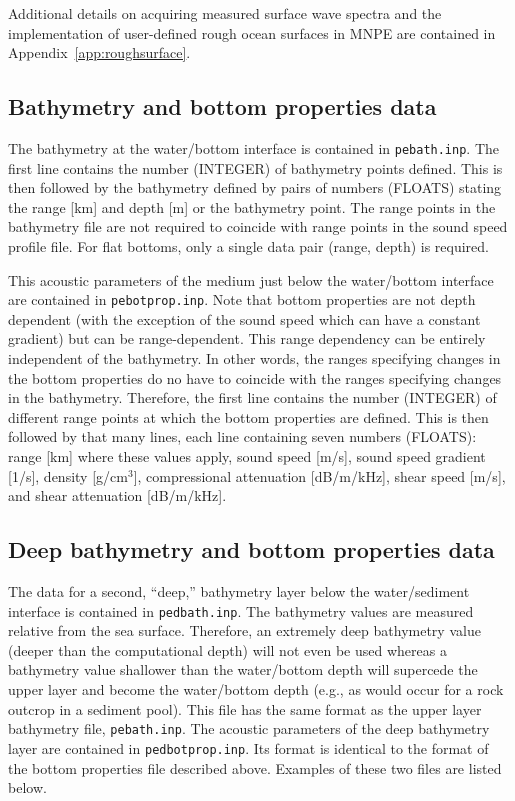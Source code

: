 Additional details on acquiring measured surface wave spectra and the implementation of user-defined rough ocean surfaces in MNPE are contained in Appendix~\ref{app:roughsurface}.

\subsection{Bathymetry and bottom properties data}

The bathymetry at the water/bottom interface is contained in \texttt{pebath.inp}. The first line contains the number (INTEGER) of bathymetry points defined. This is then followed by the bathymetry defined by pairs of numbers (FLOATS) stating the range [km] and depth [m] or the bathymetry point. The range points in the bathymetry file are not required to coincide with range points in the sound speed profile file. For flat bottoms, only a single data pair (range, depth) is required.



This acoustic parameters of the medium just below the water/bottom interface are contained in \texttt{pebotprop.inp}. Note that bottom properties are not depth dependent (with the exception of the sound speed which can have a constant gradient) but can be range-dependent. This range dependency can be entirely independent of the bathymetry. In other words, the ranges specifying changes in the bottom properties do no have to coincide with the ranges specifying changes in the bathymetry. Therefore, the first line contains the number (INTEGER) of different range points at which the bottom properties are defined. This is then followed by that many lines, each line containing seven numbers (FLOATS): range [km] where these values apply, sound speed [m/s], sound speed gradient [1/s], density [g/cm$^3$], compressional attenuation [dB/m/kHz], shear speed [m/s], and shear attenuation [dB/m/kHz].



\subsection{Deep bathymetry and bottom properties data}

The data for a second, ``deep,'' bathymetry layer below the water/sediment interface is contained in \texttt{pedbath.inp}. The bathymetry values are measured relative from the sea surface. Therefore, an extremely deep bathymetry value (deeper than the computational depth) will not even be used whereas a bathymetry value shallower than the water/bottom depth will supercede the upper layer and become the water/bottom depth (e.g., as would occur for a rock outcrop in a sediment pool). This file has the same format as the upper layer bathymetry file, \texttt{pebath.inp}. The acoustic parameters of the deep bathymetry layer are contained in \texttt{pedbotprop.inp}. Its format is identical to the format of the bottom properties file described above. Examples of these two files are listed below.




